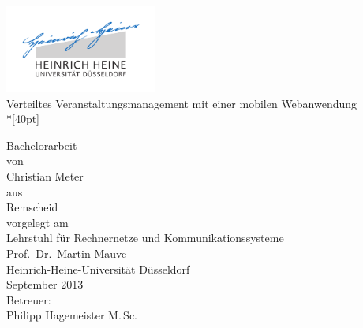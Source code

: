 
\begin{titlepage}
  \centering
  \includegraphics[width=5cm]{fig/unilogo}\\

  \vfill
  \huge
  Verteiltes Veranstaltungsmanagement mit einer mobilen Webanwendung\\*[40pt]
  \normalsize

  \vfill
  \large
  Bachelorarbeit\\[0.25em]
  \normalsize
  von\\
  \Large
  Christian Meter\\

  \vspace{5mm}
  \normalsize
  aus\\ Remscheid\\[1cm]
  vorgelegt am\\[5mm]
  Lehrstuhl für Rechnernetze und Kommunikationssysteme\\
  Prof.\ Dr.\ Martin Mauve\\ 
  Heinrich-Heine-Universität Düsseldorf\\[0.5cm]
  September 2013\\[0.5cm]
  Betreuer:\\
  Philipp Hagemeister M.\,Sc.
    
\end{titlepage}


